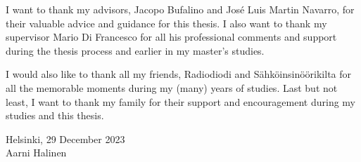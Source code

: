 \documentclass[english, 12pt, a4paper, sci, utf8, a-2b, online]{aaltothesis}
\begin{document}
\newpage

\dothesispagenumbering{}


I want to thank my advisors, Jacopo Bufalino and José Luis Martin Navarro, for their valuable advice and guidance for this thesis.
I also want to thank my supervisor Mario Di Francesco for all his professional comments and support during the thesis process and earlier in my master's studies.

I would also like to thank all my friends, Radiodiodi and Sähköinsinöörikilta for all the memorable moments during my (many) years of studies.
Last but not least, I want to thank my family for their support and encouragement during my studies and this thesis.

\vspace{5cm}
Helsinki, 29 December 2023 \\

\vspace{5mm}
{\hfill Aarni Halinen \hspace{1cm}}

\newpage

\thesistableofcontents

\end{document}
